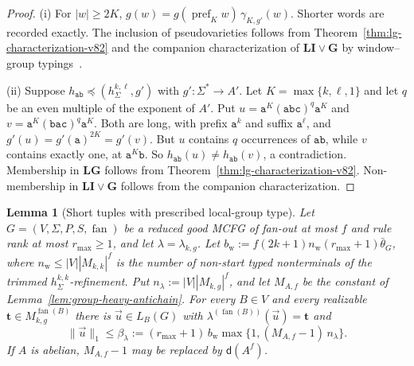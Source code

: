 \documentclass[11pt]{article}
\numberwithin{equation}{section}
\theoremstyle{plain}
\newtheorem{lemma}[theorem]{Lemma}
\theoremstyle{definition}
\theoremstyle{remark}
\newcommand{\tuple}[1]{\vec{#1}}
\newcommand{\fan}{\operatorname{fan}}
\theoremstyle{plain}
\begin{document}
\begin{proof}
(i) For $|w|\ge2K$,
$g(w)=g(\operatorname{pref}_Kw)\,\gamma_{K,g'}(w)$.  Shorter words are
recorded exactly.  The inclusion of pseudovarieties follows from
Theorem~\ref{thm:lg-characterization-v82} and the companion
characterization of $\mathbf{LI}\vee\mathbf G$ by window--group
typings~\cite[Lemma~7.4]{kuriyamaCFG}.

(ii) Suppose $h_{\mathtt{ab}}\preceq(h^{k,\ell}_\Sigma,g')$ with
$g':\Sigma^*\to A'$.  Let $K=\max\{k,\ell,1\}$ and let $q$ be an even
multiple of the exponent of $A'$.  Put
$u=\mathtt a^K(\mathtt{abc})^q\mathtt a^K$ and
$v=\mathtt a^K(\mathtt{bac})^q\mathtt a^K$.  Both are long, with prefix
$\mathtt a^k$ and suffix $\mathtt a^\ell$, and
$g'(u)=g'(\mathtt a)^{2K}=g'(v)$.  But $u$ contains $q$ occurrences of
$\mathtt{ab}$, while $v$ contains exactly one, at
$\mathtt a^K\mathtt b$.  So $h_{\mathtt{ab}}(u)\ne h_{\mathtt{ab}}(v)$,
a contradiction.  Membership in $\mathbf{LG}$ follows from
Theorem~\ref{thm:lg-characterization-v82}.  Non-membership in
$\mathbf{LI}\vee\mathbf G$ follows from the companion characterization.
\end{proof}

\begin{lemma}[Short tuples with prescribed local-group type]
\label{lem:local-group-shortest-v82}
Let $G=(V,\Sigma,P,S,\fan)$ be a reduced good MCFG of fan-out at most
$f$ and rule rank at most $r_{\max}\ge1$, and let $\lambda=\lambda_{k,g}$.
Let $b_{\mathrm w}:=f(2k+1)n_{\mathrm w}(r_{\max}+1)\bar\theta_G$, where
$n_{\mathrm w}\le|V||M_{k,k}|^f$ is the number of non-start typed
nonterminals of the trimmed $h^{k,k}_\Sigma$-refinement.  Put
$n_\lambda:=|V||M_{k,g}|^f$, and let $M_{A,f}$ be the constant of
Lemma~\ref{lem:group-heavy-antichain}.  For every $B\in V$ and every
realizable $\mathbf t\in M_{k,g}^{\fan(B)}$ there is $\tuple u\in L_B(G)$
with $\lambda^{(\fan(B))}(\tuple u)=\mathbf t$ and
\[
 \|\tuple u\|_1\le\beta_\lambda:=(r_{\max}+1)\,b_{\mathrm w}
 \max\{1,(M_{A,f}-1)\,n_\lambda\}.
\]
If $A$ is abelian, $M_{A,f}-1$ may be replaced by $\mathsf d(A^f)$.
\end{lemma}
\end{document}
